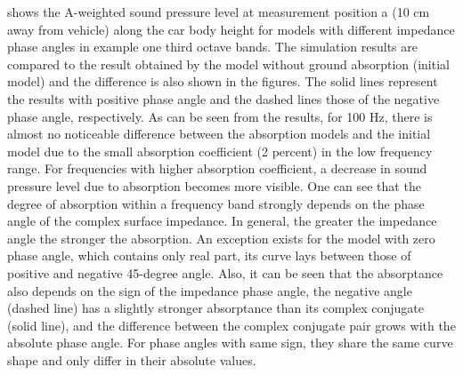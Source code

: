 \noindent {} shows the A-weighted sound pressure level at measurement position a (10 cm away from vehicle) along the car body height for models with different impedance phase angles in example one third octave bands. The simulation results are compared to the result obtained by the model without ground absorption (initial model) and the difference is also shown in the figures. The solid lines represent the results with positive phase angle and the dashed lines those of the negative phase angle, respectively. As can be seen from the results, for 100 Hz, there is almost no noticeable difference between the absorption models and the initial model due to the small absorption coefficient (2 percent) in the low frequency range. For frequencies with higher absorption coefficient, a decrease in sound pressure level due to absorption becomes more visible. One can see that the degree of absorption within a frequency band strongly depends on the phase angle of the complex surface impedance. In general, the greater the impedance angle the stronger the absorption. An exception exists for the model with zero phase angle, which contains only real part, its curve lays between those of positive and negative 45-degree angle. Also, it can be seen that the absorptance also depends on the sign of the impedance phase angle, the negative angle (dashed line) has a slightly stronger absorptance than its complex conjugate (solid line), and the difference between the complex conjugate pair grows with the absolute phase angle. For phase angles with same sign, they share the same curve shape and only differ in their absolute values.


